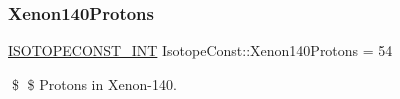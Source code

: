 \subsubsection{\texorpdfstring{Xenon140\+Protons}{Xenon140Protons}}
{\footnotesize\ttfamily \mbox{\hyperlink{group___isotope_const-_macros_ga5f18360b3e99483a35c32d789e62621c}{I\+S\+O\+T\+O\+P\+E\+C\+O\+N\+S\+T\+\_\+\+I\+NT}} Isotope\+Const\+::\+Xenon140\+Protons = 54}

\$ \$ Protons in Xenon-\/140. 